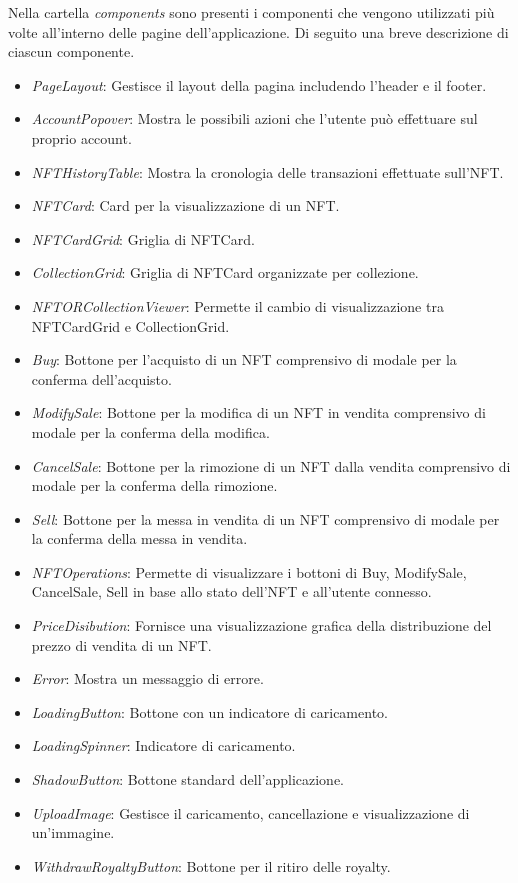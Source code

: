 Nella cartella \textit{components} sono presenti i componenti che vengono utilizzati più volte all'interno delle pagine dell'applicazione. Di seguito una breve descrizione di ciascun componente.

\begin{itemize}
    \item \textit{PageLayout}: Gestisce il layout della pagina includendo l'header e il footer.
    \item \textit{AccountPopover}: Mostra le possibili azioni che l'utente può effettuare sul proprio account.
    \item \textit{NFTHistoryTable}: Mostra la cronologia delle transazioni effettuate sull'NFT.
    \item \textit{NFTCard}: Card per la visualizzazione di un NFT.
    \item \textit{NFTCardGrid}: Griglia di NFTCard.
    \item \textit{CollectionGrid}: Griglia di NFTCard organizzate per collezione.
    \item \textit{NFTORCollectionViewer}: Permette il cambio di visualizzazione tra NFTCardGrid e CollectionGrid.
    \item \textit{Buy}: Bottone per l'acquisto di un NFT comprensivo di modale per la conferma dell'acquisto.
    \item \textit{ModifySale}: Bottone per la modifica di un NFT in vendita comprensivo di modale per la conferma della modifica.
    \item \textit{CancelSale}: Bottone per la rimozione di un NFT dalla vendita comprensivo di modale per la conferma della rimozione.
    \item \textit{Sell}: Bottone per la messa in vendita di un NFT comprensivo di modale per la conferma della messa in vendita.
    \item \textit{NFTOperations}: Permette di visualizzare i bottoni di Buy, ModifySale, CancelSale, Sell in base allo stato dell'NFT e all'utente connesso.
    \item \textit{PriceDisibution}: Fornisce una visualizzazione grafica della distribuzione del prezzo di vendita di un NFT.
    \item \textit{Error}: Mostra un messaggio di errore.
    \item \textit{LoadingButton}: Bottone con un indicatore di caricamento.
    \item \textit{LoadingSpinner}: Indicatore di caricamento.
    \item \textit{ShadowButton}: Bottone standard dell'applicazione.
    \item \textit{UploadImage}: Gestisce il caricamento, cancellazione e visualizzazione di un'immagine.
    \item \textit{WithdrawRoyaltyButton}: Bottone per il ritiro delle royalty.
\end{itemize}

